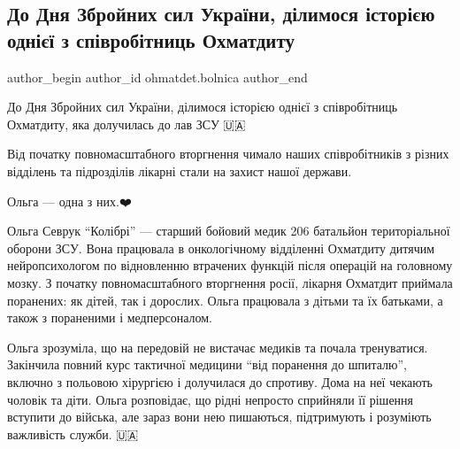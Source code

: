  
 
 
 
 
 
\subsection{До Дня Збройних сил України, ділимося історією однієї з співробітниць Охматдиту}
\label{sec:06_12_2022.fb.ohmatdet.bolnica.1.istoria_zsu}
 
\ifcmt
 author_begin
   author_id ohmatdet.bolnica
 author_end
\fi

До Дня Збройних сил України, ділимося історією однієї з співробітниць
Охматдиту, яка долучилась до лав ЗСУ 🇺🇦

Від початку повномасштабного вторгнення чимало наших співробітників з різних
відділень та підрозділів лікарні стали на захист нашої держави.

Ольга — одна з них.❤️


Ольга Севрук \enquote{Колібрі} — старший бойовий медик 206 батальйон територіальної
оборони ЗСУ. Вона працювала в онкологічному відділенні Охматдиту дитячим
нейропсихологом по відновленню втрачених функцій після операцій на головному
мозку. З початку повномасштабного вторгнення росії, лікарня Охматдит приймала
поранених: як дітей, так і дорослих. Ольга працювала з дітьми та їх батьками, а
також з пораненими і медперсоналом.🏥


Ольга зрозуміла, що на передовій не вистачає медиків та почала тренуватися.
Закінчила повний курс тактичної медицини \enquote{від поранення до шпиталю}, включно з
польовою хірургією і долучилася до спротиву. Дома на неї чекають чоловік та
діти. Ольга розповідає, що рідні непросто сприйняли її рішення вступити до
війська, але зараз вони нею пишаються, підтримують і розуміють важливість
служби. 🇺🇦

